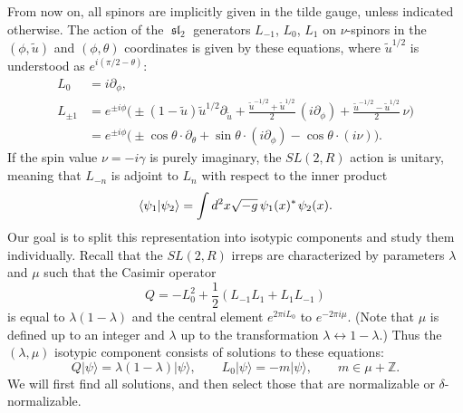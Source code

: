 \documentclass[12pt]{article}
\newcommand*{\ket}[1]{|{#1}\rangle}
\newcommand*{\braket}[2]{\langle{#1}|{#2}\rangle}
\newcommand{\ZZ}{\mathbb{Z}}
\newcommand{\RR}{\mathbb{R}}
\DeclareMathOperator{\SL}{SL}
\DeclareMathOperator{\sL}{\mathfrak{sl}}
\newcommand{\tu}{\tilde{u}}
\def\widetilde#1{#1}%
\def\SL{SL}
\def\RR{R}
\begin{document}
From now on, all spinors are implicitly given in the tilde gauge, unless indicated otherwise.
The action of the $\sL_2$ generators $L_{-1}$, $L_{0}$, $L_{1}$ on $\nu$-spinors in the $(\phi,\tu)$ and $(\phi,\theta)$ coordinates is given by these equations, where $\tu^{1/2}$ is understood as $e^{i(\pi/2-\theta)}$:
\begin{equation} \label{sl2gen}
\begin{aligned}
L_0&=i\partial_{\phi},\\[6pt]
L_{\pm1}&=e^{\pm i\phi}
\biggl(\pm(1-\tu)\tu^{1/2}\partial_{\tu}
+\frac{\tu^{-1/2}+\tu^{1/2}}{2}\,(i\partial_{\phi})
+\frac{\tu^{-1/2}-\tu^{1/2}}{2}\,\nu\biggr)\\[3pt]
&=e^{\pm i\phi}
\bigl(\pm\cos\theta\cdot\partial_{\theta}
+\sin\theta\cdot(i\partial_{\phi})-\cos\theta\cdot(i\nu)\bigr).
\end{aligned}
\end{equation}
If the spin value $\nu=-i\gamma$ is purely imaginary, the $\widetilde{\SL}(2,\RR)$ action is unitary, meaning that $L_{-n}$ is adjoint to $L_{n}$ with respect to the inner product
\begin{equation}\label{ip_AdS}
\braket{\psi_1}{\psi_2}=\int d^2 x \sqrt{-g}\,\psi_1(x)^*\kern1pt \psi_2(x).
\end{equation}
Our goal is to split this representation into isotypic components and study them individually. Recall that the $\widetilde{\SL}(2,\RR)$ irreps are characterized by parameters $\lambda$ and $\mu$ such that the Casimir operator
\begin{equation} \label{Qdef}
Q=-L_0^2+\frac{1}{2}(L_{-1}L_1+L_1L_{-1})
\end{equation}
is equal to $\lambda(1-\lambda)$ and the central element $e^{2\pi iL_0}$ to  $e^{-2\pi i\mu}$. (Note that $\mu$ is defined up to an integer and $\lambda$ up to the transformation $\lambda\leftrightarrow 1-\lambda$.) Thus the $(\lambda,\mu)$ isotypic component consists of solutions to these equations:
\begin{equation} \label{compeq}
Q\ket{\psi}=\lambda(1-\lambda)\ket{\psi},\qquad
L_0\ket{\psi}=-m\ket{\psi},\qquad m\in\mu+\ZZ.
\end{equation}
We will first find all solutions, and then select those that are normalizable or $\delta$-normalizable. 
\end{document}
